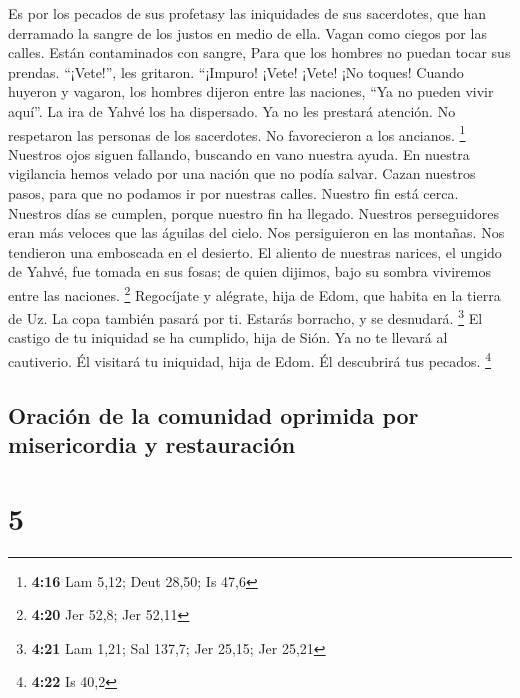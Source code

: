  Es por los pecados de sus profetasy las iniquidades de
sus sacerdotes, que han derramado la sangre de los justos en medio de
ella.  Vagan como ciegos por las calles. Están
contaminados con sangre, Para que los hombres no puedan tocar sus
prendas.  ``¡Vete!'', les gritaron. ``¡Impuro! ¡Vete!
¡Vete! ¡No toques! Cuando huyeron y vagaron, los hombres dijeron entre
las naciones, ``Ya no pueden vivir aquí''.  La ira de
Yahvé los ha dispersado. Ya no les prestará atención. No respetaron las
personas de los sacerdotes. No favorecieron a los ancianos. \footnote{\textbf{4:16}
  Lam 5,12; Deut 28,50; Is 47,6}  Nuestros ojos siguen
fallando, buscando en vano nuestra ayuda. En nuestra vigilancia hemos
velado por una nación que no podía salvar.  Cazan
nuestros pasos, para que no podamos ir por nuestras calles. Nuestro fin
está cerca. Nuestros días se cumplen, porque nuestro fin ha llegado.
 Nuestros perseguidores eran más veloces que las águilas
del cielo. Nos persiguieron en las montañas. Nos tendieron una emboscada
en el desierto.  El aliento de nuestras narices, el
ungido de Yahvé, fue tomada en sus fosas; de quien dijimos, bajo su
sombra viviremos entre las naciones. \footnote{\textbf{4:20} Jer 52,8;
  Jer 52,11}  Regocíjate y alégrate, hija de Edom, que
habita en la tierra de Uz. La copa también pasará por ti. Estarás
borracho, y se desnudará. \footnote{\textbf{4:21} Lam 1,21; Sal 137,7;
  Jer 25,15; Jer 25,21}  El castigo de tu iniquidad se ha
cumplido, hija de Sión. Ya no te llevará al cautiverio. Él visitará tu
iniquidad, hija de Edom. Él descubrirá tus pecados. \footnote{\textbf{4:22}
  Is 40,2}

\hypertarget{oraciuxf3n-de-la-comunidad-oprimida-por-misericordia-y-restauraciuxf3n}{%
\subsection{Oración de la comunidad oprimida por misericordia y
restauración}\label{oraciuxf3n-de-la-comunidad-oprimida-por-misericordia-y-restauraciuxf3n}}

\hypertarget{section-4}{%
\section{5}\label{section-4}}

